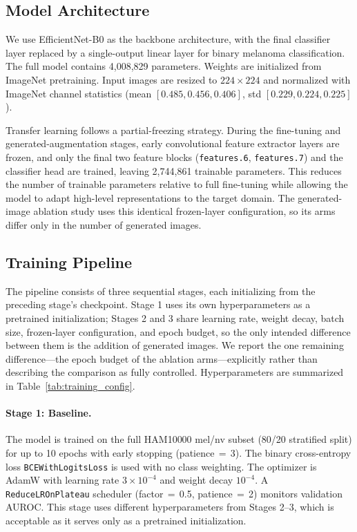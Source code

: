 \subsection{Model Architecture}

We use EfficientNet-B0 \cite{Tan2019EfficientNet} as the backbone architecture, with the final classifier layer replaced by a single-output linear layer for binary melanoma classification. The full model contains 4,008,829 parameters. Weights are initialized from ImageNet pretraining. Input images are resized to $224 \times 224$ and normalized with ImageNet channel statistics (mean $[0.485, 0.456, 0.406]$, std $[0.229, 0.224, 0.225]$).

Transfer learning follows a partial-freezing strategy. During the fine-tuning and generated-augmentation stages, early convolutional feature extractor layers are frozen, and only the final two feature blocks (\texttt{features.6}, \texttt{features.7}) and the classifier head are trained, leaving 2,744,861 trainable parameters. This reduces the number of trainable parameters relative to full fine-tuning while allowing the model to adapt high-level representations to the target domain. The generated-image ablation study uses this identical frozen-layer configuration, so its arms differ only in the number of generated images.

\subsection{Training Pipeline}

The pipeline consists of three sequential stages, each initializing from the preceding stage's checkpoint. Stage 1 uses its own hyperparameters as a pretrained initialization; Stages 2 and 3 share learning rate, weight decay, batch size, frozen-layer configuration, and epoch budget, so the only intended difference between them is the addition of generated images. We report the one remaining difference---the epoch budget of the ablation arms---explicitly rather than describing the comparison as fully controlled. Hyperparameters are summarized in Table~\ref{tab:training_config}.

\paragraph{Stage 1: Baseline.}
The model is trained on the full HAM10000 mel/nv subset (80/20 stratified split) for up to 10 epochs with early stopping (patience\,$=$\,3). The binary cross-entropy loss \texttt{BCEWithLogitsLoss} is used with no class weighting. The optimizer is AdamW with learning rate $3 \times 10^{-4}$ and weight decay $10^{-4}$. A \texttt{ReduceLROnPlateau} scheduler (factor\,$=$\,0.5, patience\,$=$\,2) monitors validation AUROC. This stage uses different hyperparameters from Stages 2--3, which is acceptable as it serves only as a pretrained initialization.

